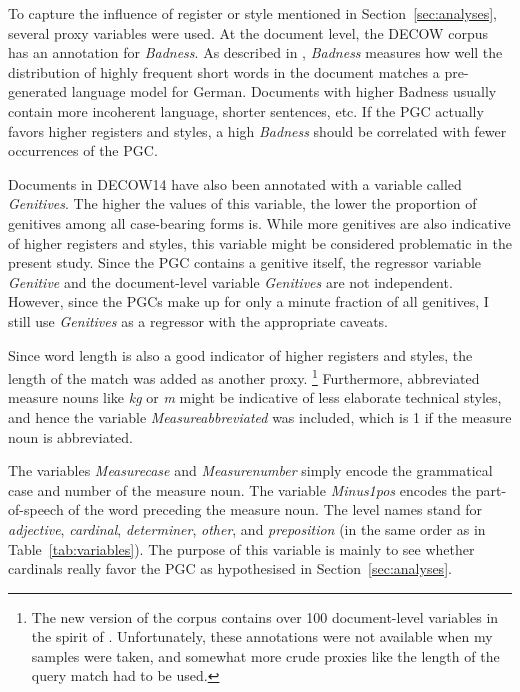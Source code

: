 \documentclass[USenglish]{article}
\begin{document}
To capture the influence of register or style mentioned in Section~\ref{sec:analyses}, several proxy variables were used.
At the document level, the DECOW corpus has an annotation for \textit{Badness}.
As described in \cite{SchaeferEa2013}, \textit{Badness} measures how well the distribution of highly frequent short words in the document matches a pre-generated language model for German.
Documents with higher Badness usually contain more incoherent language, shorter sentences, etc.
If the PGC actually favors higher registers and styles, a high \textit{Badness} should be correlated with fewer occurrences of the PGC.

Documents in DECOW14 have also been annotated with a variable called \textit{Genitives}.
The higher the values of this variable, the lower the proportion of genitives among all case-bearing forms is.
While more genitives are also indicative of higher registers and styles, this variable might be considered problematic in the present study.
Since the PGC contains a genitive itself, the regressor variable \textit{Genitive} and the document-level variable \textit{Genitives} are not independent.
However, since the PGCs make up for only a minute fraction of all genitives, I still use \textit{Genitives} as a regressor with the appropriate caveats.

Since word length is also a good indicator of higher registers and styles, the length of the match was added as another proxy.%
\footnote{The new version of the corpus contains over 100 document-level variables in the spirit of \cite{Biber1988}.
Unfortunately, these annotations were not available when my samples were taken, and somewhat more crude proxies like the length of the query match had to be used.}
Furthermore, abbreviated measure nouns like \textit{kg} or \textit{m} might be indicative of less elaborate technical styles, and hence the variable \textit{Measureabbreviated} was included, which is 1 if the measure noun is abbreviated.

The variables \textit{Measurecase} and \textit{Measurenumber} simply encode the grammatical case and number of the measure noun.
The variable \textit{Minus1pos} encodes the part-of-speech of the word preceding the measure noun.
The level names stand for \textit{adjective}, \textit{cardinal}, \textit{determiner}, \textit{other}, and \textit{preposition} (in the same order as in Table~\ref{tab:variables}).
The purpose of this variable is mainly to see whether cardinals really favor the PGC as hypothesised in Section~\ref{sec:analyses}.
\end{document}
